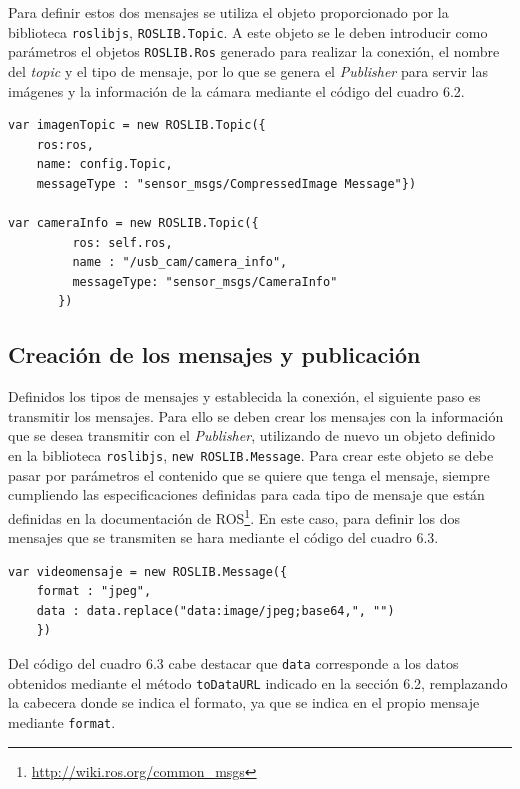 Para definir estos dos mensajes se utiliza el objeto proporcionado por la biblioteca \texttt{roslibjs}, \texttt{ROSLIB.Topic}. A este objeto se le deben introducir como parámetros el objetos \texttt{ROSLIB.Ros} generado para realizar la conexión, el nombre del \textit{topic} y el tipo de mensaje, por lo que se genera el \textit{Publisher} para servir las imágenes y la información de la cámara mediante el código del cuadro 6.2.
\begin{lstlisting}[caption= Estructura de los mensajes, label=cod.estrucuturamensajes]
var imagenTopic = new ROSLIB.Topic({
	ros:ros, 
	name: config.Topic, 
	messageType : "sensor_msgs/CompressedImage Message"})
	
var cameraInfo = new ROSLIB.Topic({
         ros: self.ros,
         name : "/usb_cam/camera_info",
         messageType: "sensor_msgs/CameraInfo"
       })

\end{lstlisting}

\subsection{Creación de los mensajes y publicación}
Definidos los tipos de mensajes y establecida la conexión, el siguiente paso es transmitir los mensajes. Para ello se deben crear los mensajes con la información que se desea transmitir con el \textit{Publisher}, utilizando de nuevo un objeto definido en la biblioteca \texttt{roslibjs}, \texttt{new ROSLIB.Message}. Para crear este objeto se debe pasar por parámetros el contenido que se quiere que tenga el mensaje, siempre cumpliendo las especificaciones definidas para cada tipo de mensaje que están definidas en la documentación de ROS\footnote{\url{http://wiki.ros.org/common_msgs}}. En este caso, para definir los dos mensajes que se transmiten se hara mediante el código del cuadro 6.3.
\begin{lstlisting}[caption= Definición del mensaje para las imágenes, label=cod.definicionmensajeimg]
 var videomensaje = new ROSLIB.Message({
 	format : "jpeg", 
	data : data.replace("data:image/jpeg;base64,", "")
	})

\end{lstlisting}
Del código del cuadro 6.3 cabe destacar que \texttt{data} corresponde a los datos obtenidos mediante el método \texttt{toDataURL} indicado en la sección 6.2, remplazando la cabecera donde se indica el formato, ya que se indica en el propio mensaje mediante \texttt{format}. 

